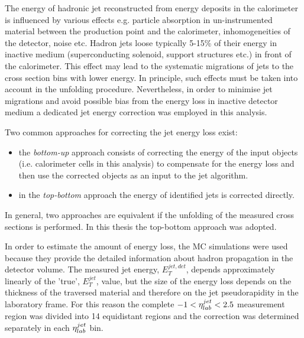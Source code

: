 The energy of hadronic jet reconstructed from energy deposits in the calorimeter is influenced by various effects e.g. particle absorption in un-instrumented material between the production point and the calorimeter, inhomogeneities of the detector, noise etc. Hadron jets loose typically 5-15\% of their energy in inactive medium (superconducting solenoid, support structures etc.) in front of the calorimeter. This effect may lead to the systematic migrations of jets to the cross section bins with lower energy. In principle, such effects must be taken into account in the unfolding procedure. Nevertheless, in order to minimise jet migrations and avoid possible bias from the energy loss in inactive detector medium a dedicated jet energy correction was employed in this analysis.

Two common approaches for correcting the jet energy loss exist:
\begin{itemize}
 \item the \emph{bottom-up} approach consists of correcting the energy of the input objects (i.e. calorimeter cells in this analysis) to compensate for the energy loss and then use the corrected objects as an input to the jet algorithm.
 \item in the \emph{top-bottom} approach the energy of identified jets is corrected directly.
\end{itemize}
In general, two approaches are equivalent if the unfolding of the measured cross sections is performed. In this thesis the top-bottom approach was adopted.

In order to estimate the amount of energy loss, the MC simulations were used because they provide the detailed information about hadron propagation in the detector volume. The measured jet energy, $E_T^{jet,det}$, depends approximately linearly of the 'true', $E_T^{jet}$, value, but the size of the energy loss depends on the thickness of the traversed material and therefore on the jet pseudorapidity in the laboratory frame. For this reason the complete $-1<\mbox{$\eta^{jet}_{lab}$}<2.5$ measurement region was divided into 14 equidistant regions and the correction was determined separately in each $\mbox{$\eta^{jet}_{lab}$}$ bin.


